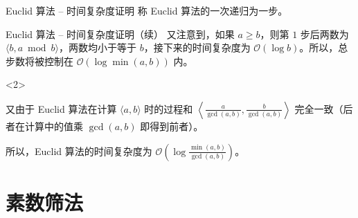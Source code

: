 \documentclass{../pkslide}
\begin{document}
\begin{frame}{Euclid 算法 -- 时间复杂度证明}
  称 Euclid 算法的一次递归为一步。
  
  
  
\end{frame}

\begin{frame}{Euclid 算法 -- 时间复杂度证明（续）}
  又注意到，如果 $a \ge b$，则第 $1$ 步后两数为 $\langle b, a \bmod b \rangle$，两数均小于等于 $b$，接下来的时间复杂度为 $\mathcal O (\log b)$。所以，总步数将被控制在 $\mathcal O (\log \min(a, b))$ 内。
  
  \begin{visibleenv}<2>
    \emptyline
    
    又由于 Euclid 算法在计算 $\langle a, b \rangle$ 时的过程和 $\left\langle \frac{a}{\gcd(a, b)}, \frac{b}{\gcd(a, b)} \right\rangle$ 完全一致（后者在计算中的值乘 $\gcd(a, b)$ 即得到前者）。
    
    所以，Euclid 算法的时间复杂度为 $\mathcal O \!\left( \log \frac{\min(a, b)}{\gcd(a, b)} \right)$。
  \end{visibleenv}
\end{frame}


\section{素数筛法}
\end{document}
